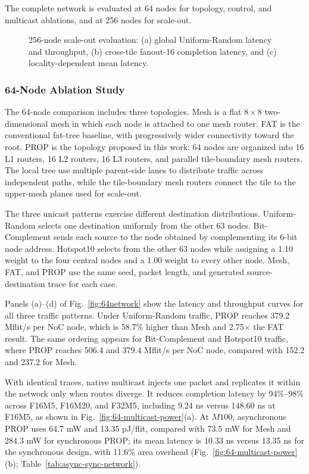\documentclass[conference]{IEEEtran}
\begin{document}
The complete network is evaluated at 64 nodes for topology, control, and
multicast ablations, and at 256 nodes for scale-out.

\begin{figure}[!t]
\centering

\caption{256-node scale-out evaluation: (a) global Uniform-Random latency and throughput, (b) cross-tile fanout-16 completion latency, and (c) locality-dependent mean latency.}
\label{fig:256network}
\end{figure}

\subsubsection{64-Node Ablation Study}

The 64-node comparison includes three topologies. Mesh is a flat
\(8\times8\) two-dimensional mesh in which each node is attached to one
mesh router. FAT is the conventional fat-tree baseline, with progressively
wider connectivity toward the root. PROP is the topology
proposed in this work: 64 nodes are organized into 16 L1 routers, 16 L2
routers, 16 L3 routers, and parallel tile-boundary mesh routers. The local tree
use multiple parent-side lanes to distribute traffic across independent
paths, while the tile-boundary mesh routers connect the tile to the
upper-mesh planes used for scale-out.

The three unicast patterns exercise different destination distributions.
Uniform-Random selects one destination uniformly from the other 63 nodes.
Bit-Complement sends each source to the node obtained by complementing its
6-bit node address. Hotspot10 selects from the other 63 nodes while assigning
a 1.10 weight to the four central nodes and a 1.00 weight to every other
node. Mesh, FAT, and PROP use the same seed, packet length, and generated
source-destination trace for each case.

Panels (a)--(d) of Fig.~\ref{fig:64network} show the latency and throughput
curves for all three traffic patterns. Under Uniform-Random traffic, PROP
reaches 379.2 Mflit/s per NoC node, which is 58.7\% higher than Mesh and
2.75$\times$ the FAT result. The same ordering appears for Bit-Complement
and Hotspot10 traffic, where PROP reaches 506.4 and 379.4 Mflit/s per NoC
node, compared with 152.2 and 237.2 for Mesh.

With identical traces, native multicast injects one packet and replicates it
within the network only when routes diverge. It reduces completion latency by 94\%--98\% across F16M5, F16M20,
and F32M5, including 9.24 ns versus 148.60 ns at F16M5, as shown in
Fig.~\ref{fig:64-multicast-power}(a). At \(M100\), asynchronous PROP uses 64.7 mW
and 13.35 pJ/flit, compared with 73.5 mW for Mesh and 284.3 mW for synchronous
PROP; its mean latency is 10.33 ns versus 13.35 ns for the synchronous design, with 11.6\%
area overhead (Fig.~\ref{fig:64-multicast-power}(b); Table~\ref{tab:async-sync-network}).
\end{document}
